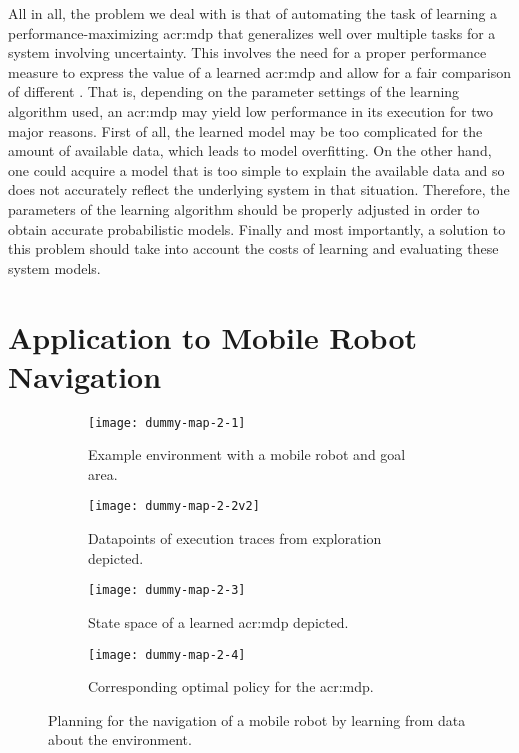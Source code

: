 All in all, the problem we deal with is that of automating the task of learning a performance-maximizing \acrshort{acr:mdp} that generalizes well over multiple tasks for a system involving uncertainty.
This involves the need for a proper performance measure to express the value of a learned \acrshort{acr:mdp} and allow for a fair comparison of different .
That is, depending on the parameter settings of the learning algorithm used, an \acrshort{acr:mdp} may yield low performance in its execution for two major reasons.
First of all, the learned model may be too complicated for the amount of available data, which leads to model overfitting.
On the other hand, one could acquire a model that is too simple to explain the available data and so does not accurately reflect the underlying system in that situation.
Therefore, the parameters of the learning algorithm should be properly adjusted in order to obtain accurate probabilistic models.
Finally and most importantly, a solution to this problem should take into account the costs of learning and evaluating these system models.

\section{Application to Mobile Robot Navigation}
\label{sec:application-mobile-robot}

\begin{figure}[t]
	\centering
	
	\captionsetup{font=small}
	\captionsetup[subfigure]{font=footnotesize}
	\captionsetup[subfigure]{justification=centering}
	\begin{subfigure}{.5\textwidth}
		\centering
		\texttt{[image: dummy-map-2-1]}
		\caption{Example environment with a mobile robot and goal area.}
		\label{fig:dummy-map-1}
	\end{subfigure}\hfill
	\begin{subfigure}{.5\textwidth}
		\centering
		\texttt{[image: dummy-map-2-2v2]}
		\caption{Datapoints of execution traces from exploration depicted.}
		\label{fig:dummy-map-2}
	\end{subfigure}
	
	\bigskip
	
	\begin{subfigure}{.5\textwidth}
		\centering
		\texttt{[image: dummy-map-2-3]}
		\caption{State space of a learned \acrshort{acr:mdp} depicted.}
		\label{fig:dummy-map-3}
	\end{subfigure}\hfill
	\begin{subfigure}{.5\textwidth}
		\centering
		\texttt{[image: dummy-map-2-4]}
		\caption{Corresponding optimal policy for the \acrshort{acr:mdp}.}
		\label{fig:dummy-map-4}
	\end{subfigure}
	\caption{Planning for the navigation of a mobile robot by learning  from data about the environment.}
\end{figure}

